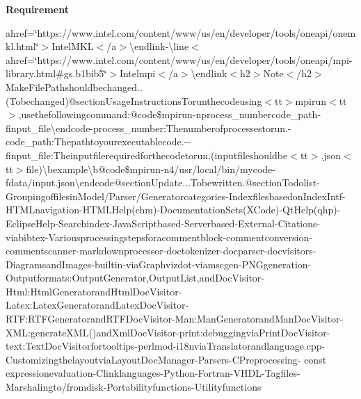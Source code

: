 {\bfseries Requirement} {\bfseries } 
\begin{DoxyItemize}
\item ahref=\char`\"{}https\-://www.\-intel.\-com/content/www/us/en/developer/tools/oneapi/onemkl.\-html\char`\"{}$>$\-IntelM\-K\-L$<$/a$>$\textbackslash{}endlink-\/\textbackslash{}line$<$ahref=\char`\"{}https\-://www.\-intel.\-com/content/www/us/en/developer/tools/oneapi/mpi-\/library.\-html\#gs.\-b1bib5\char`\"{}$>$\-Intelmpi$<$/a$>$\textbackslash{}endlink$<$h2$>$\-Note$<$/h2$>$Make\-FilePathshouldbechanged..(\-Tobechanged)@sectionUsageInstructionsTorunthecodeusing$<$tt$>$mpirun$<$tt$>$,usethefollowingcommand\-:@code\$mpirun-\/nprocess\-\_\-numbercode\-\_\-path-\/finput\-\_\-file\textbackslash{}endcode-\/process\-\_\-number\-:Thenumberofprocessestorun.-\/code\-\_\-path\-:Thepathtoyourexecutablecode.-\/-\/finput\-\_\-file\-:Theinputfilerequiredforthecodetorun.(inputfileshouldbe$<$tt$>$.\-json$<$tt$>$file)\textbackslash{}bexample\textbackslash{}b@code\$mpirun-\/n4/usr/local/bin/mycode-\/fdata/input.\-json\textbackslash{}endcode@sectionUpdate...Tobewritten.@sectionTodolist-\/GroupingoffilesinModel/Parser/Generatorcategories-\/IndexfilesbasedonIndex\-Intf-\/H\-T\-M\-Lnavigation-\/H\-T\-M\-LHelp(chm)-\/DocumentationSets(\-X\-Code)-\/QtHelp(qhp)-\/EclipseHelp-\/Searchindex-\/Java\-Scriptbased-\/Serverbased-\/External-\/Citations-\/viabibtex-\/Variousprocessingstepsforacommentblock-\/commentconversion-\/commentscanner-\/markdownprocessor-\/doctokenizer-\/docparser-\/docvisitors-\/DiagramsandImages-\/builtin-\/viaGraphvizdot-\/viamscgen-\/P\-N\-Ggeneration-\/Outputformats\-:Output\-Generator,Output\-List,andDoc\-Visitor-\/Html\-:Html\-GeneratorandHtml\-Doc\-Visitor-\/Latex\-:Latex\-GeneratorandLatex\-Doc\-Visitor-\/R\-T\-F\-:R\-T\-F\-GeneratorandR\-T\-F\-Doc\-Visitor-\/Man\-:Man\-GeneratorandMan\-Doc\-Visitor-\/X\-M\-L\-:generate\-X\-M\-L()andXml\-Doc\-Visitor-\/print\-:debuggingviaPrint\-Doc\-Visitor-\/text\-:Text\-Doc\-Visitorfortooltips-\/perlmod-\/i18nviaTranslatorandlanguage.\-cpp-\/CustomizingthelayoutviaLayout\-Doc\-Manager-\/Parsers-\/CPreprocessing-\/ const expressionevaluation-\/Clinklanguages-\/Python-\/Fortran-\/V\-H\-D\-L-\/Tagfiles-\/Marshalingto/fromdisk-\/Portabilityfunctions-\/Utilityfunctions
\end{DoxyItemize}